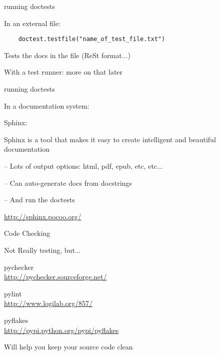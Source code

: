 \documentclass{beamer}
\begin{document}
\begin{frame}[fragile]{running doctests}

\vfill
{\Large In an external file:}

\begin{verbatim}
    doctest.testfile("name_of_test_file.txt")
\end{verbatim}

{\large Tests the docs in the file (ReSt format...) }


\vfill
{\large With a test runner: more on that later}

\vfill
\end{frame} 

\begin{frame}[fragile]{running doctests}

\vfill
{\large In a documentation system:}

\vfill
{\LARGE Sphinx:}

\vfill
{\Large Sphinx is a tool that makes it easy to create intelligent and beautiful documentation}

\vfill
{\Large -- Lots of output options: html, pdf, epub, etc, etc...}

\vfill
{\Large -- Can auto-generate docs from docstrings}

\vfill
{\Large -- And run the doctests}

\vfill
\url{http://sphinx.pocoo.org/}
\end{frame} 

\begin{frame}[fragile]{Code Checking}

{\LARGE Not Really testing, but...}

\vfill
{\LARGE pychecker}\\
\url{http://pychecker.sourceforge.net/}

\vfill
{\LARGE pylint}\\
\url{http://www.logilab.org/857/}

\vfill
{\LARGE pyflakes}\\
\url{http://pypi.python.org/pypi/pyflakes}

\vfill
{\Large Will help you keep your source code clean}

\end{frame} 
\end{document}
